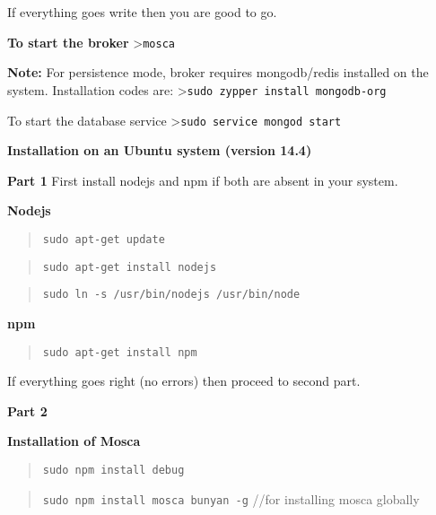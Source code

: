 \documentclass[16pt]{article}
\begin{document}
If everything goes write then you are good to go.
 \vspace{0.5cm}

\textbf{To start the broker} \textgreater{}\texttt{mosca}

\textbf{Note:} For persistence mode, broker requires mongodb/redis
installed on the system. Installation codes are:
\textgreater{}\texttt{sudo zypper install mongodb-org}

To start the database service
\textgreater{}\texttt{sudo service mongod start}
 \vspace{0.5cm}


\textbf{Installation on an Ubuntu system (version
14.4)}

\textbf{Part 1} First install nodejs and npm if both are absent in your
system.

\textbf{Nodejs}

\begin{quote}
\texttt{sudo apt-get update}
\end{quote}

\begin{quote}
\texttt{sudo apt-get install nodejs}
\end{quote}

\begin{quote}
\texttt{sudo ln -s /usr/bin/nodejs /usr/bin/node}
\end{quote}

\textbf{npm}

\begin{quote}
\texttt{sudo apt-get install npm}
\end{quote}

If everything goes right (no errors) then proceed to second part.

 \vspace{0.3cm}

\textbf{Part 2}

\textbf{Installation of Mosca}

\begin{quote}
\texttt{sudo npm install debug}
\end{quote}

\begin{quote}
\texttt{sudo npm install mosca bunyan -g} //for installing mosca
globally
\end{quote}
\end{document}
